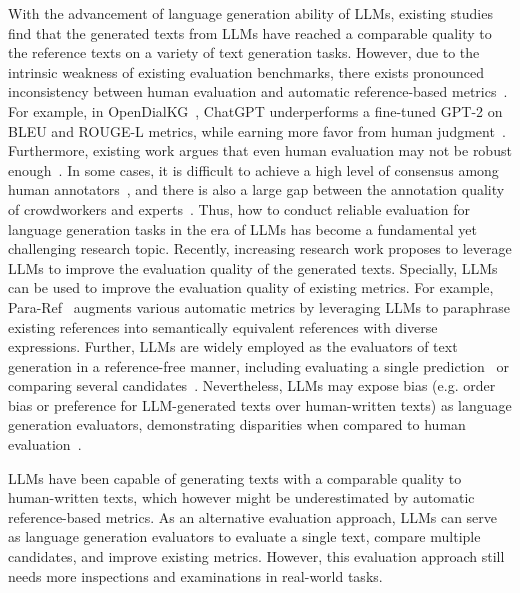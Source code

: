 {{{{{With the advancement of  language generation ability of LLMs, existing studies find that the generated texts from LLMs have reached a comparable quality to the reference texts on a variety of text  generation tasks. However, due to the intrinsic weakness of existing evaluation benchmarks, there exists pronounced inconsistency between human evaluation and automatic reference-based metrics~\cite{Zhang-2023-arxiv-Benchmarking,Goyal-2023-arxiv-News,Gehrmann-2022-arxiv-Repairing,Bang-arxiv-2023-A}. For example, in OpenDialKG~\cite{Moon-ACL-2019-OpenDialKG}, ChatGPT underperforms a fine-tuned GPT-2 on BLEU and ROUGE-L metrics, while earning more favor from human judgment~\cite{Bang-arxiv-2023-A}. Furthermore, existing work argues that even human evaluation may  not be robust enough~\cite{Goyal-2023-arxiv-News,Zhang-2023-arxiv-Benchmarking,Liu-arxiv-2022-Revisiting,Fabri-2021-tacl-SummEval}. In some cases, it is difficult to achieve a high level of consensus among human annotators~\cite{Goyal-2023-arxiv-News}, and there is also a large gap between the annotation quality of crowdworkers and experts~\cite{Fabri-2021-tacl-SummEval,Liu-arxiv-2022-Revisiting}. Thus, how to conduct reliable evaluation for language generation tasks in the era of LLMs has become a fundamental yet challenging research topic. Recently, increasing research work proposes to leverage LLMs to improve the evaluation quality of the generated texts. Specially, LLMs can be   used to improve the evaluation quality of existing metrics. For example, Para-Ref~\cite{Tang-2023-arxiv-Not} augments various automatic metrics by leveraging LLMs to paraphrase existing references into semantically equivalent references with diverse expressions. Further, LLMs are widely employed as the evaluators of text generation in a reference-free manner, including evaluating a single prediction~\cite{Wang-2023-arxiv-Is,Liu-2023-arxiv-G-Eval,Wang-2023-arxiv-rethinking} or comparing several candidates~\cite{Gao-arxiv-2023-Human,Ji-2023-arxiv-Exploring,vicuna2023,Bai-2023-arxiv-Benchmarking}. Nevertheless, LLMs may expose bias (e.g. order bias or preference for LLM-generated texts over human-written texts) as language generation evaluators, demonstrating disparities when compared to human evaluation~\cite{Liu-2023-arxiv-Evaluate,Liu-2023-arxiv-G-Eval,Wang-2023-arxiv-Large}.

\begin{center}
\begin{tcolorbox}[colback=blue!5!white,colframe=blue!55!black,width=0.46\textwidth,title={Unreliable Generation Evaluation}] LLMs have been capable of generating texts with a comparable quality to human-written texts, which however might be underestimated by automatic reference-based metrics. As an alternative evaluation approach, LLMs can serve as language generation evaluators to evaluate a single text, compare multiple candidates, and improve existing metrics. However, this evaluation approach still needs more inspections and examinations in real-world tasks.  
\end{tcolorbox}
\end{center}

}}}}}
